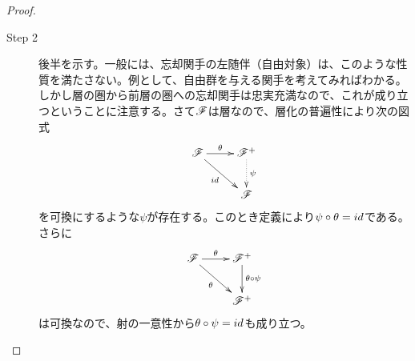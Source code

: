 \begin{proof}
\begin{description}
\begin{comment}
さて$\gra \in \scrf^+_P$とする。ある$(V,f) \in \coprod_{P \in V} \scrf^+(V)$があって、$\gra = f_P$と表せる。$f \in \scrf^+(V)$なので、さらに$f|_W = \ol{s}$となるような$(W,s) \in \coprod_{P \in W \subset V} \scrf(W)$がとれる。このとき
\begin{align*}
  \grt_P \circ \wt{\psi} (\gra) &= \grt_P \circ \wt{\psi} (f_P) \\
  &= \grt_P \circ \psi_V (f) \\
  &= \grt_P (f(P)) \\
  &= \grt_P (s_P) \\
  &= \grt_W (s)_P \\
  &= (\ol{s})_P \\
  &= (f|_W)_P \\
  &= f_P \\
  &= \gra
\end{align*}
だから、$\grt_P \circ \wt{\psi} = id$がいえた。

逆に$\beta \in \scrf_P$とする。$\beta = s_P$なる$(V,s) \in \coprod_{P \in V} \scrf(V)$がある。このとき
\begin{align*}
  \wt{\psi} \circ \grt_P(\beta ) & = \wt{\psi} \circ \grt_P(s_P) \\
  &= \wt{\psi} (\grt_V (s)_P ) \\
  &= \psi_V ( \grt_V (s)) \\
  &= \psi_V (\ol{s}) \\
  &= \ol{s}(P) \\
  &= s_P \\
  &= \beta
\end{align*}
であるから、$\wt{\psi} \circ \grt_P = id$である。これで同型がいえた。
\end{comment}
\item[Step 2] 後半を示す。一般には、忘却関手の左随伴（自由対象）は、このような性質を満たさない。例として、自由群を与える関手を考えてみればわかる。しかし層の圏から前層の圏への忘却関手は忠実充満なので、これが成り立つということに注意する。さて$\mathscr{F}$は層なので、層化の普遍性により次の図式
\[
\xymatrix{
\scrf \ar[r]^-{\grt} \ar[rd]_-{id} & \scrf^+ \ar@{.>}[d]^-{\psi} \\
{} & \scrf
}
\]
を可換にするような$\psi$が存在する。このとき定義により$\psi \circ {\theta} = id$である。さらに
\[
\xymatrix{
\scrf \ar[r]^-{\grt} \ar[rd]_-{\grt} & \scrf^+ \ar[d]^-{\grt \circ \psi} \\
{} & \scrf^+
}
\]
は可換なので、射の一意性から${\theta} \circ \psi = id$も成り立つ。
  \end{description}
\end{proof}


